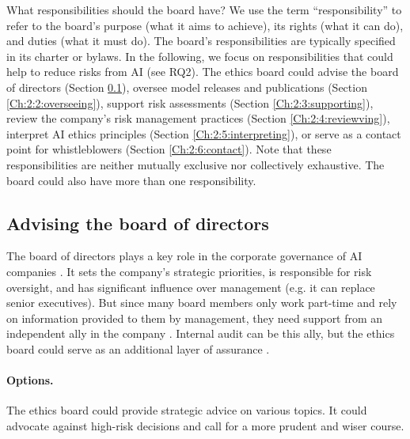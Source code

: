 \documentclass{article}
\begin{document}
What responsibilities should the board have? We use the term “responsibility” to refer to the board’s purpose (what it aims to achieve), its rights (what it can do), and duties (what it must do). The board’s responsibilities are typically specified in its charter or bylaws. In the following, we focus on responsibilities that could help to reduce risks from AI (see RQ2). The ethics board could advise the board of directors (Section \ref{Ch:2:1:advising}), oversee model releases and publications (Section \ref{Ch:2:2:overseeing}), support risk assessments (Section \ref{Ch:2:3:supporting}), review the company’s risk management practices (Section \ref{Ch:2:4:reviewving}), interpret AI ethics principles (Section \ref{Ch:2:5:interpreting}), or serve as a contact point for whistleblowers (Section \ref{Ch:2:6:contact}). Note that these responsibilities are neither mutually exclusive nor collectively exhaustive. The board could also have more than one responsibility.

\subsection{Advising the board of directors}\label{Ch:2:1:advising}

The board of directors plays a key role in the corporate governance of AI companies \cite{cihon2021corporate}. It sets the company’s strategic priorities, is responsible for risk oversight, and has significant influence over management (e.g. it can replace senior executives). But since many board members only work part-time and rely on information provided to them by management, they need support from an independent ally in the company \cite{davies2018three}. Internal audit can be this ally, but the ethics board could serve as an additional layer of assurance \cite{schuett2022lines}.

\paragraph{Options.} The ethics board could provide strategic advice on various topics. It could advocate against high-risk decisions and call for a more prudent and wiser course.
\end{document}
